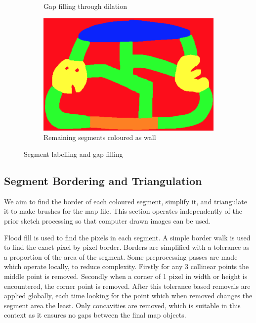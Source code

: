 \documentclass[11pt]{IEEEtran}
\begin{document}
\begin{figure}[h]
\begin{subfigure}[b]{0.24\textwidth}
         \caption{Gap filling through dilation}
         \label{fig:l3}
     \end{subfigure}
     \hfill
     \begin{subfigure}[b]{0.24\textwidth}
         \centering
         \includegraphics[width=\textwidth]{l4}
         \caption{Remaining segments coloured as wall}
         \label{fig:l4}
     \end{subfigure}
        \caption{Segment labelling and gap filling}
        \label{fig:labelling}
\end{figure}

\subsection{Segment Bordering and Triangulation}

We aim to find the border of each coloured segment, simplify it, and triangulate it to make brushes for the map file. This section operates independently of the prior sketch processing so that computer drawn images can be used.

Flood fill is used to find the pixels in each segment. A simple border walk is used to find the exact pixel by pixel border. Borders are simplified with a tolerance as a proportion of the area of the segment. Some preprocessing passes are made which operate locally, to reduce complexity. Firstly for any 3 collinear points the middle point is removed. Secondly when a corner of 1 pixel in width or height is encountered, the corner point is removed. After this tolerance based removals are applied globally, each time looking for the point which when removed changes the segment area the least. Only concavities are removed, which is suitable in this context as it ensures no gaps between the final map objects.
\end{document}
